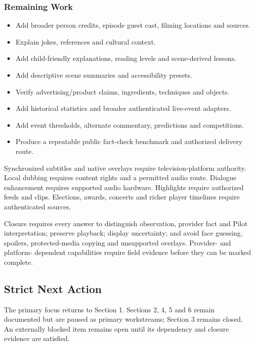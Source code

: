 \subsubsection{Remaining Work}

\begin{itemize}
  \item Add broader person credits, episode guest cast, filming locations and sources.
  \item Explain jokes, references and cultural context.
  \item Add child-friendly explanations, reading levels and scene-derived lessons.
  \item Add descriptive scene summaries and accessibility presets.
  \item Verify advertising/product claims, ingredients, techniques and objects.
  \item Add historical statistics and broader authenticated live-event adapters.
  \item Add event thresholds, alternate commentary, predictions and competitions.
  \item Produce a repeatable public fact-check benchmark and authorized delivery route.
\end{itemize}

Synchronized subtitles and native overlays require television-platform authority.
Local dubbing requires content rights and a permitted audio route. Dialogue enhancement
requires supported audio hardware. Highlights require authorized feeds and clips.
Elections, awards, concerts and richer player timelines require authenticated sources.

Closure requires every answer to distinguish observation, provider fact and Pilot
interpretation; preserve playback; display uncertainty; and avoid face guessing,
spoilers, protected-media copying and unsupported overlays. Provider- and platform-
dependent capabilities require field evidence before they can be marked complete.

\subsection{Strict Next Action}

The primary focus returns to Section 1. Sections 2, 4, 5 and 6 remain documented
but are paused as primary workstreams; Section 3 remains closed. An externally
blocked item remains open until its dependency and closure evidence are satisfied.

